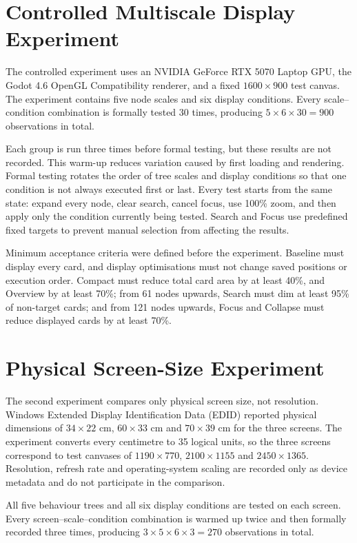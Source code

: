 \section{Controlled Multiscale Display Experiment}

The controlled experiment uses an NVIDIA GeForce RTX 5070 Laptop GPU, the Godot 4.6 OpenGL Compatibility renderer, and a fixed \(1600 \times 900\) test canvas. The experiment contains five node scales and six display conditions. Every scale--condition combination is formally tested 30 times, producing \(5 \times 6 \times 30 = 900\) observations in total.

Each group is run three times before formal testing, but these results are not recorded. This warm-up reduces variation caused by first loading and rendering. Formal testing rotates the order of tree scales and display conditions so that one condition is not always executed first or last. Every test starts from the same state: expand every node, clear search, cancel focus, use 100\% zoom, and then apply only the condition currently being tested. Search and Focus use predefined fixed targets to prevent manual selection from affecting the results.

Minimum acceptance criteria were defined before the experiment. Baseline must display every card, and display optimisations must not change saved positions or execution order. Compact must reduce total card area by at least 40\%, and Overview by at least 70\%; from 61 nodes upwards, Search must dim at least 95\% of non-target cards; and from 121 nodes upwards, Focus and Collapse must reduce displayed cards by at least 70\%.

\section{Physical Screen-Size Experiment}

The second experiment compares only physical screen size, not resolution. Windows Extended Display Identification Data (EDID) reported physical dimensions of \(34 \times 22\) cm, \(60 \times 33\) cm and \(70 \times 39\) cm for the three screens. The experiment converts every centimetre to 35 logical units, so the three screens correspond to test canvases of \(1190 \times 770\), \(2100 \times 1155\) and \(2450 \times 1365\). Resolution, refresh rate and operating-system scaling are recorded only as device metadata and do not participate in the comparison.

All five behaviour trees and all six display conditions are tested on each screen. Every screen--scale--condition combination is warmed up twice and then formally recorded three times, producing \(3 \times 5 \times 6 \times 3 = 270\) observations in total.

